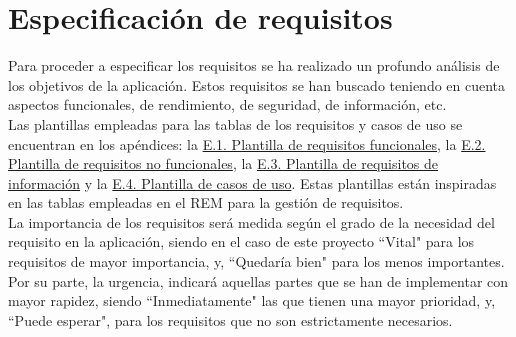 \chapter{Especificación de requisitos}
\label{enlaceespecificacion}

Para proceder a especificar los requisitos se ha realizado un profundo análisis de los objetivos de la aplicación. Estos requisitos se han buscado teniendo en cuenta aspectos funcionales, de rendimiento, de seguridad, de información, etc.
\\

Las plantillas empleadas para las tablas de los requisitos y casos de uso se encuentran en los apéndices: la \hyperref[enlaceFRQX]{E.1. Plantilla de requisitos funcionales}, la \hyperref[enlaceNFRX]{E.2. Plantilla de requisitos no funcionales}, la \hyperref[enlaceIRQX]{E.3. Plantilla de requisitos de información} y la \hyperref[enlaceUCX]{E.4. Plantilla de casos de uso}.
Estas plantillas están inspiradas en las tablas empleadas en el REM \cite{rem} para la gestión de requisitos.
\\

La importancia de los requisitos será medida según el grado de la necesidad del requisito en la aplicación, siendo en el caso de este proyecto ``Vital" para los requisitos de mayor importancia, y, ``Quedaría bien" para los menos importantes. Por su parte, la urgencia, indicará aquellas partes que se han de implementar con mayor rapidez, siendo ``Inmediatamente" las que tienen una mayor prioridad, y, ``Puede esperar", para los requisitos que no son estrictamente necesarios.




